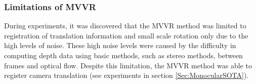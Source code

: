 \subsubsection{Limitations of MVVR}

During experiments, it was discovered that the MVVR method was limited to registration of translation information and small scale rotation only due to the high levels of noise. These high noise levels  were caused by the difficulty in computing depth data using basic methods, such as stereo methods, between frames and optical flow. Despite this limitation, the MVVR method was able to register camera translation (see experiments in section \ref{Sec:MonocularSOTA}).  